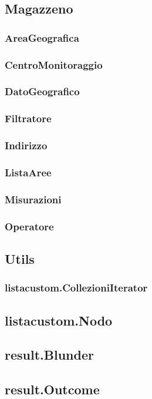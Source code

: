 \documentclass[a4paper, 12pt,twoside]{article}
\begin{document}
		\subsection{Magazzeno}
			\subsubsection{AreaGeografica}
			\subsubsection{CentroMonitoraggio}
			\subsubsection{DatoGeografico}
			\subsubsection{Filtratore}
			\subsubsection{Indirizzo}
			\subsubsection{ListaAree}
			\subsubsection{Misurazioni}
			\subsubsection{Operatore}
		
		\subsection{Utils}
			\subsubsection{listacustom.CollezioniIterator}
			\subsection{listacustom.Nodo}
			\subsection{result.Blunder}
			\subsection{result.Outcome}
\end{document}
